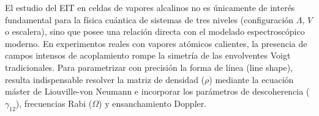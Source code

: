 El estudio del EIT en celdas de vapores alcalinos no es únicamente de interés fundamental para la física cuántica de sistemas de tres niveles (configuración $\Lambda$, $V$ o escalera), sino que posee una relación directa con el modelado espectroscópico moderno. En experimentos reales con vapores atómicos calientes, la presencia de campos intensos de acoplamiento rompe la simetría de las envolventes Voigt tradicionales. Para parametrizar con precisión la forma de línea (line shape), resulta indispensable resolver la matriz de densidad ($\rho$) mediante la ecuación máster de Liouville-von Neumann e incorporar los parámetros de descoherencia ($\gamma_{12}$), frecuencias Rabi ($\Omega$) y ensanchamiento Doppler.
